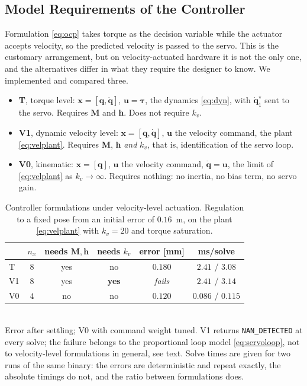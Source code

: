 \documentclass{ieeeaccess}
\begin{document}
\subsection{Model Requirements of the Controller}
\label{sec:whichmodel}
Formulation \eqref{eq:ocp} takes torque as the decision variable while the
actuator accepts velocity, so the predicted velocity is passed to the servo. This
is the customary arrangement, but on velocity-actuated hardware it is not the only
one, and the alternatives differ in what they require the designer to know. We
implemented and compared three.

\begin{itemize}[leftmargin=*]
\item \textbf{T}, torque level: $\bm x=[\bm q,\dot{\bm q}]$, $\bm u=\bm\tau$, the
dynamics \eqref{eq:dyn}, with $\dot{\bm q}^\star_1$ sent to the servo. Requires
$\bm M$ and $\bm h$. Does not require $k_v$.
\item \textbf{V1}, dynamic velocity level: $\bm x=[\bm q,\dot{\bm q}]$, $\bm u$ the
velocity command, the plant \eqref{eq:velplant}. Requires $\bm M$, $\bm h$
\emph{and} $k_v$, that is, identification of the servo loop.
\item \textbf{V0}, kinematic: $\bm x=[\bm q]$, $\bm u$ the velocity command,
$\dot{\bm q}=\bm u$, the limit of \eqref{eq:velplant} as $k_v\to\infty$. Requires
nothing: no inertia, no bias term, no servo gain.
\end{itemize}

\begin{table}[!t]
\caption{Controller formulations under velocity-level actuation. Regulation to a
fixed pose from an initial error of $0.16$~m, on the plant \eqref{eq:velplant}
with $k_v=20$ and torque saturation.}
\label{tab:formulations}
\centering
\footnotesize
\setlength{\tabcolsep}{3.5pt}
\begin{tabular}{lccccc}
\toprule
 & $n_x$ & needs $\bm M,\bm h$ & needs $k_v$ & error [mm] & ms/solve\\
\midrule
T  & $8$ & yes & no  & $0.180$ & $2.41$ / $3.08$\\
V1 & $8$ & yes & \textbf{yes} & \emph{fails} & $2.41$ / $3.14$\\
V0 & $4$ & no  & no  & $\bm{0.120}$ & $\bm{0.086}$ / $\bm{0.115}$\\
\bottomrule
\end{tabular}
\vspace{2pt}
\\{\footnotesize Error after settling; V0 with command weight tuned. V1 returns
\texttt{NAN\_DETECTED} at every solve; the failure belongs to the proportional
loop model \eqref{eq:servoloop}, not to velocity-level formulations in general,
see text. Solve times are given for two
runs of the same binary: the errors are deterministic and repeat exactly, the
absolute timings do not, and the ratio between formulations does.}
\end{table}
\end{document}
